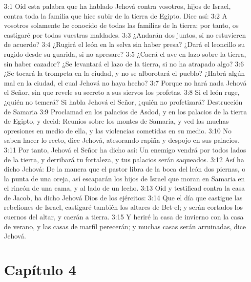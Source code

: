 3:1 Oíd esta palabra que ha hablado Jehová contra vosotros, hijos de Israel, contra toda la familia que hice subir de la tierra de Egipto. Dice así:   
3:2 A vosotros solamente he conocido de todas las familias de la tierra; por tanto, os castigaré por todas vuestras maldades.   
3:3 ¿Andarán dos juntos, si no estuvieren de acuerdo?   
3:4 ¿Rugirá el león en la selva sin haber presa? ¿Dará el leoncillo su rugido desde su guarida, si no apresare?   
3:5 ¿Caerá el ave en lazo sobre la tierra, sin haber cazador? ¿Se levantará el lazo de la tierra, si no ha atrapado algo?   
3:6 ¿Se tocará la trompeta en la ciudad, y no se alborotará el pueblo? ¿Habrá algún mal en la ciudad, el cual Jehová no haya hecho?   
3:7 Porque no hará nada Jehová el Señor, sin que revele su secreto a sus siervos los profetas.   
3:8 Si el león ruge, ¿quién no temerá? Si habla Jehová el Señor, ¿quién no profetizará?   
Destrucción de Samaria   
3:9 Proclamad en los palacios de Asdod, y en los palacios de la tierra de Egipto, y decid: Reuníos sobre los montes de Samaria, y ved las muchas opresiones en medio de ella, y las violencias cometidas en su medio.   
3:10 No saben hacer lo recto, dice Jehová, atesorando rapiña y despojo en sus palacios.   
3:11 Por tanto, Jehová el Señor ha dicho así: Un enemigo vendrá por todos lados de la tierra, y derribará tu fortaleza, y tus palacios serán saqueados.   
3:12 Así ha dicho Jehová: De la manera que el pastor libra de la boca del león dos piernas, o la punta de una oreja, así escaparán los hijos de Israel que moran en Samaria en el rincón de una cama, y al lado de un lecho.   
3:13 Oíd y testificad contra la casa de Jacob, ha dicho Jehová Dios de los ejércitos:   
3:14 Que el día que castigue las rebeliones de Israel, castigaré también los altares de Bet-el; y serán cortados los cuernos del altar, y caerán a tierra.   
3:15 Y heriré la casa de invierno con la casa de verano, y las casas de marfil perecerán; y muchas casas serán arruinadas, dice Jehová.   
\section*{Capítulo 4  }
  
